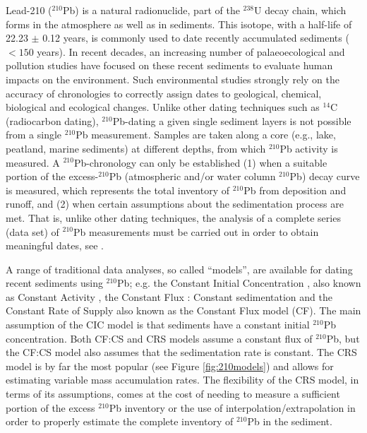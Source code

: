 \documentclass [10pt] {article}
\begin{document}
	Lead-210 ($^{210}$Pb) is a natural radionuclide, part of the $^{238}$U decay chain, which forms in the atmosphere as well as in sediments.
This isotope, with a half-life of 22.23 $\pm$ 0.12 years, is commonly used to date recently accumulated sediments ($<150$ years). 
In recent decades, an increasing number of palaeoecological and pollution studies have focused on these recent sediments \citep[e.g.,][]{Courtney2019} to evaluate human impacts on the environment.
Such environmental studies strongly rely on the accuracy of chronologies to correctly assign dates to geological, chemical, biological and ecological changes.
Unlike other dating techniques such as $^{14}$C (radiocarbon dating), $^{210}$Pb-dating a given single sediment layers is not possible from a single $^{210}$Pb measurement.
Samples are taken along a core (e.g., lake, peatland, marine sediments) at different depths, from which $^{210}$Pb activity is measured.
A $^{210}$Pb-chronology can only be established (1) when a suitable portion of the excess-$^{210}$Pb (atmospheric and/or water column $^{210}$Pb) decay curve is measured, which represents the total inventory of $^{210}$Pb from deposition and runoff, and (2) when certain assumptions about the sedimentation process are met.
That is, unlike other dating techniques, the analysis of a complete series (data set) of $^{210}$Pb measurements must be carried out in order to obtain meaningful dates, see \citet{Aquino2018}.


	A range of traditional data analyses, so called ``models'', are available for dating recent sediments using $^{210}$Pb; e.g. the Constant Initial Concentration \citep[CIC,][]{Goldberg1963}, also known as Constant Activity \citep[CA,][]{Robbins1975}, the Constant Flux : Constant sedimentation \citep[CF:CS,][]{Crozaz1964} and the Constant Rate of Supply  \citep[CRS,][]{Appleby1978,Robbins1978,Sanchez-Cabeza2012} also known as the Constant Flux model (CF). 
The main assumption of the CIC model is that sediments have a constant initial $^{210}$Pb concentration. 
Both CF:CS and CRS models assume a constant flux of $^{210}$Pb, but the CF:CS model also assumes that the sedimentation rate is constant. 
The CRS model is by far the most popular (see Figure \ref{fig:210models}) and allows for estimating variable mass accumulation rates.
The flexibility of the CRS model, in terms of its assumptions, comes at the cost of needing to measure a sufficient portion of the excess $^{210}$Pb inventory or the use of interpolation/extrapolation in order to properly estimate the complete inventory of $^{210}$Pb in the sediment. 
\end{document}

